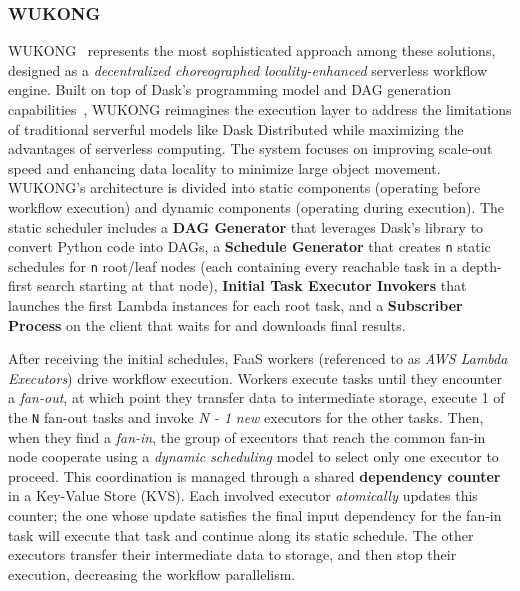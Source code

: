 \begin{itemize}
\subsubsection{WUKONG}
WUKONG~\cite{wukong_2} represents the most sophisticated approach among these solutions, designed as a \textit{decentralized choreographed locality-enhanced} serverless workflow engine. Built on top of Dask's programming model and DAG generation capabilities~\cite{wukong_2}, WUKONG reimagines the execution layer to address the limitations of traditional serverful models like Dask Distributed while maximizing the advantages of serverless computing. The system focuses on improving scale-out speed and enhancing data locality to minimize large object movement. WUKONG's architecture is divided into static components (operating before workflow execution) and dynamic components (operating during execution). The static scheduler includes a \textbf{DAG Generator} that leverages Dask's library to convert Python code into DAGs, a \textbf{Schedule Generator} that creates \texttt{n} static schedules for \texttt{n} root/leaf nodes (each containing every reachable task in a depth-first search starting at that node), \textbf{Initial Task Executor Invokers} that launches the first Lambda instances for each root task, and a \textbf{Subscriber Process} on the client that waits for and downloads final results.

After receiving the initial schedules, FaaS workers (referenced to as \textit{AWS Lambda Executors}) drive workflow execution. Workers execute tasks until they encounter a \textit{fan-out}, at which point they transfer data to intermediate storage, execute 1 of the \texttt{N} fan-out tasks and invoke \textit{N - 1} \textit{new} executors for the other tasks. Then, when they find a \textit{fan-in}, the group of executors that reach the common fan-in node cooperate using a \textit{dynamic scheduling} model to select only one executor to proceed. This coordination is managed through a shared \textbf{dependency counter} in a Key-Value Store (KVS). Each involved executor \textit{atomically} updates this counter; the one whose update satisfies the final input dependency for the fan-in task will execute that task and continue along its static schedule. The other executors transfer their intermediate data to storage, and then stop their execution, decreasing the workflow parallelism.


\end{itemize}

